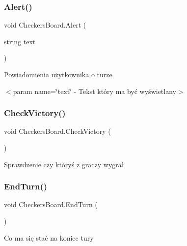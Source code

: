 \subsubsection{\texorpdfstring{Alert()}{Alert()}}
{\footnotesize\ttfamily void Checkers\+Board.\+Alert (\begin{DoxyParamCaption}\item[{string}]{text }\end{DoxyParamCaption})}



Powiadomienia użytkownika o turze 

$<$param name=\char`\"{}text\char`\"{} -\/ Tekst który ma być wyświetlany$>$\mbox{\label{class_checkers_board_ac148b117df6e0d374ff9a35b0e0854d2}} 
\subsubsection{\texorpdfstring{CheckVictory()}{CheckVictory()}}
{\footnotesize\ttfamily void Checkers\+Board.\+Check\+Victory (\begin{DoxyParamCaption}{ }\end{DoxyParamCaption})\hspace{0.3cm}{\ttfamily [private]}}



Sprawdzenie czy któryś z graczy wygrał 

\mbox{\label{class_checkers_board_a149bffb6407cae2045c8545a90306d82}} 
\subsubsection{\texorpdfstring{EndTurn()}{EndTurn()}}
{\footnotesize\ttfamily void Checkers\+Board.\+End\+Turn (\begin{DoxyParamCaption}{ }\end{DoxyParamCaption})\hspace{0.3cm}{\ttfamily [private]}}



Co ma się stać na koniec tury 

\mbox{\label{class_checkers_board_acc289a7520fabb912525ef2a417a6e14}} 
